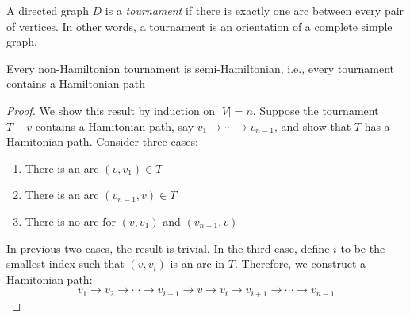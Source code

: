 \begin{definition}[Tournament]
A directed graph $D$ is a \emph{tournament}
if there is exactly one arc between every pair of vertices.
In other words, a tournament is an orientation of a complete simple graph.
\end{definition}

\begin{theorem}[Redei]
Every non-Hamiltonian tournament is semi-Hamiltonian, i.e., 
every tournament contains a Hamiltonian path
\end{theorem}
\begin{proof}
We show this result by induction on $|V|=n$.
Suppose the tournament $T-v$ contains a Hamitonian path, say $v_1\to\cdots\to v_{n-1}$, and show that $T$ has a Hamitonian path.
Consider three cases:
\begin{enumerate}
\item
There is an arc $(v,v_1)\in T$
\item
There is an arc $(v_{n-1},v)\in T$
\item
There is no arc for $(v,v_1)$ and $(v_{n-1},v)$
\end{enumerate}
In previous two cases, the result is trivial.
In the third case, define $i$ to be the smallest index such that $(v,v_i)$ is an arc in $T$.
Therefore, we construct a Hamitonian path:
\[
v_1\to v_2\to\cdots\to v_{i-1}\to v\to v_i\to v_{i+1}\to\cdots\to v_{n-1}
\]
\end{proof}


